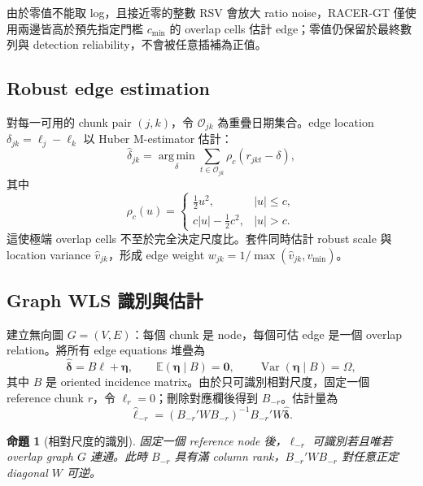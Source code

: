 \documentclass[12pt,a4paper,oneside]{article}
\newtheorem{proposition}{命題}[section]
\newcommand{\E}{\mathbb{E}}
\newcommand{\Var}{\operatorname{Var}}
\newcommand{\argmin}{\operatorname*{arg\,min}}
\begin{document}
由於零值不能取 log，且接近零的整數 RSV 會放大 ratio noise，RACER-GT 僅使用兩邊皆高於預先指定門檻 $c_{\min}$ 的 overlap cells 估計 edge；零值仍保留於最終數列與 detection reliability，不會被任意插補為正值。

\subsection{Robust edge estimation}

對每一可用的 chunk pair $(j,k)$，令 $\mathcal{O}_{jk}$ 為重疊日期集合。edge location $\delta_{jk}=\ell_j-\ell_k$ 以 Huber M-estimator 估計：
\begin{equation}
\widehat\delta_{jk}
=\argmin_{\delta}\sum_{t\in\mathcal{O}_{jk}}
\rho_c(r_{jkt}-\delta),
\end{equation}
其中
\begin{equation}
\rho_c(u)=
\begin{cases}
\frac{1}{2}u^2, & |u|\le c,\\
c|u|-\frac{1}{2}c^2, & |u|>c.
\end{cases}
\end{equation}
這使極端 overlap cells 不至於完全決定尺度比。套件同時估計 robust scale 與 location variance $\widehat v_{jk}$，形成 edge weight $w_{jk}=1/\max(\widehat v_{jk},v_{\min})$。

\subsection{Graph WLS 識別與估計}

建立無向圖 $G=(V,E)$：每個 chunk 是 node，每個可估 edge 是一個 overlap relation。將所有 edge equations 堆疊為
\begin{equation}
\widehat{\bm\delta}=B\bm\ell+\bm\eta,
\qquad \E(\bm\eta\mid B)=\bm 0,
\qquad \Var(\bm\eta\mid B)=\Omega,
\label{eq:graphlinear}
\end{equation}
其中 $B$ 是 oriented incidence matrix。由於只可識別相對尺度，固定一個 reference chunk $r$，令 $\ell_r=0$；刪除對應欄後得到 $B_{-r}$。估計量為
\begin{equation}
\widehat{\bm\ell}_{-r}
=(B_{-r}'WB_{-r})^{-1}B_{-r}'W\widehat{\bm\delta}.
\label{eq:graphwls}
\end{equation}

\begin{proposition}[相對尺度的識別]
固定一個 reference node 後，$\bm\ell_{-r}$ 可識別若且唯若 overlap graph $G$ 連通。此時 $B_{-r}$ 具有滿 column rank，$B_{-r}'WB_{-r}$ 對任意正定 diagonal $W$ 可逆。
\end{proposition}
\end{document}
